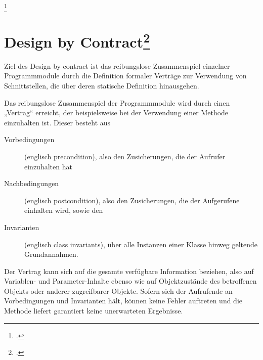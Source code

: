 \documentclass{lehramt-informatik-haupt}
\begin{document}
\footcite[Seite 44]{sosy:fs:5}

%

\section{Design by Contract\footcite{wiki:design-by-contract}}

Ziel des Design by contract ist das reibungslose Zusammenspiel einzelner
Programmmodule durch die Definition formaler Verträge zur Verwendung von
Schnittstellen, die über deren statische Definition hinausgehen.

Das reibungslose Zusammenspiel der Programmmodule wird durch einen
„Vertrag“ erreicht, der beispielsweise bei der Verwendung einer Methode
einzuhalten ist. Dieser besteht aus

\begin{description}
\item[Vorbedingungen] (englisch precondition), also den Zusicherungen,
die der Aufrufer einzuhalten hat

\item[Nachbedingungen] (englisch postcondition), also den Zusicherungen,
die der Aufgerufene einhalten wird, sowie den

\item[Invarianten] (englisch class invariants), über alle Instanzen
einer Klasse hinweg geltende Grundannahmen.
\end{description}

Der Vertrag kann sich auf die gesamte verfügbare Information beziehen,
also auf Variablen- und Parameter-Inhalte ebenso wie auf Objektzustände
des betroffenen Objekts oder anderer zugreifbarer Objekte. Sofern sich
der Aufrufende an Vorbedingungen und Invarianten hält, können keine
Fehler auftreten und die Methode liefert garantiert keine unerwarteten
Ergebnisse.

\literatur
\end{document}
